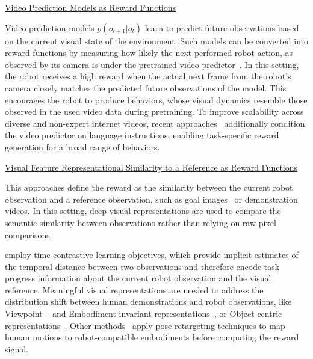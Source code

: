 \underline{Video Prediction Models as Reward Functions}

Video prediction models $p(o_{t+1}|o_t)$ learn to predict future observations based on the current visual state of the environment.
Such models can be converted into reward functions by measuring how likely the next performed robot action, as observed by its camera is under the pretrained video predictor~\cite{Huang2023DiffusionRL, Zhu2023GuidingOR, Escontrela2023VideoPM}.
In this setting, the robot receives a high reward when the actual next frame from the robot's camera closely matches the predicted future observations of the model. %
This encourages the robot to produce behaviors, whose visual dynamics resemble those observed in the used video data during pretraining. To improve scalability across diverse and non-expert internet videos, recent approaches~\cite{Escontrela2023VideoPM} additionally condition the video predictor on language instructions, enabling task-specific reward generation for a broad range of behaviors.



\underline{Visual Feature Representational Similarity to a Reference as Reward Functions}

This approaches define the reward as the similarity between the current robot observation and a reference observation, such as goal images~\cite{Ma2022VIPTU} or demonstration videos. In this setting, deep visual representations are used to compare the semantic similarity between observations rather than relying on raw pixel comparisons.

\textcite{Ma2022VIPTU} employ time-contrastive learning objectives, which provide implicit estimates of the temporal distance between two observations and therefore encode task progress information about the current robot observation and the visual reference. Meaningful visual representations are needed to address the distribution shift between human demonstrations and robot observations, like Viewpoint-~\cite{Aytar2018PlayingHE, Sermanet2017TimeContrastiveNS} and Embodiment-invariant representations~\cite{Zakka2021XIRLCI}, or Object-centric representations~\cite{Sieb2019GraphStructuredVI, Kumar2022GraphIR, Chang2020SemanticVN}.
Other methods~\cite{Qin2021DexMVIL, Mandikal2022DexVIPLD} apply pose retargeting techniques to map human motions to robot-compatible embodiments before computing the reward signal.







